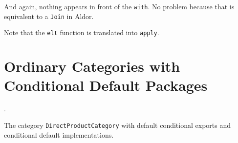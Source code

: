 \documentclass{article}
\begin{document}
And again, nothing appears in front of the \verb'with'. No problem
because that is equivalent to a \verb'Join' in Aldor.

Note that the \verb'elt' function is translated into \verb'apply'.



















\section{Ordinary Categories with Conditional Default Packages}
\label{sec:Category+ConditionalDefault}.

The category \verb'DirectProductCategory' with default conditional
exports and conditional default implementations.
\end{document}
